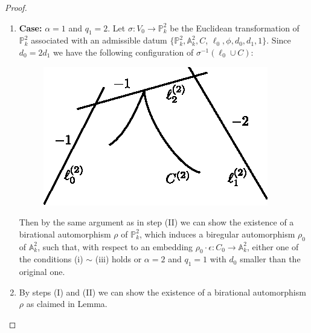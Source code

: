 \begin{proof}
\begin{enumerate}
\item {\bf Case:} $\alpha=1$ and $q_{1}=2$. Let $\sigma:V_{0}\to
  \mathbb{P}^{2}_{k}$ be the Euclidean transformation of
  $\mathbb{P}^{2}_{k}$ associated with an admissible datum
  $\{\mathbb{P}^{2}_{k},\mathbb{A}^{2}_{k}, C$, $\ell_{0},\phi,d_{0},d_{1},1\}$. Since
  $d_{0}=2d_{1}$ we have the following configuration of
  $\sigma^{-1}(\ell_{0}\cup C)$:
\begin{figure}[H]
\centering
\includegraphics{figures/chap2-fig9.eps}
\end{figure}
Then by the same argument as in step (II) we can show the existence of
a birational automorphism $\rho$ of $\mathbb{P}^{2}_{k}$, which
induces a biregular automorphism $\rho_{0}$ of $\mathbb{A}^{2}_{k}$,
such that, with respect to an embedding
$\rho_{0}\cdot\epsilon:C_{0}\to \mathbb{A}^{2}_{k}$, either one of the
conditions (i) $\sim$ (iii) holds or $\alpha=2$ and $q_{1}=1$ with
$d_{0}$ smaller than the original one.

\item By steps (I) and (II) we can show the existence of a birational
  automorphism $\rho$ as claimed in Lemma.
\end{enumerate}
\end{proof}


